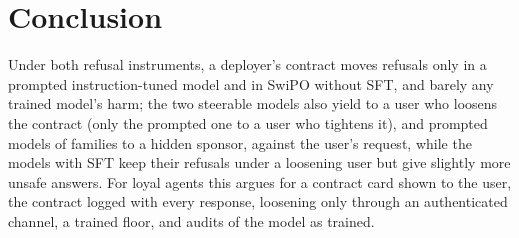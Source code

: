 \documentclass[letterpaper]{article} %
\begin{document}
\section{Conclusion}

Under both refusal instruments, a deployer's contract moves refusals only in a prompted instruction-tuned model and in SwiPO without SFT, and barely any trained model's harm; the two steerable models also yield to a user who loosens the contract (only the prompted one to a user who tightens it), and prompted models of \nSponsorFamilies{} families to a hidden sponsor, against the user's request, while the models with SFT keep their refusals under a loosening user but give slightly more unsafe answers. For loyal agents this argues for a contract card shown to the user, the contract logged with every response, loosening only through an authenticated channel, a trained floor, and audits of the model as trained.

{\small

}
\end{document}
